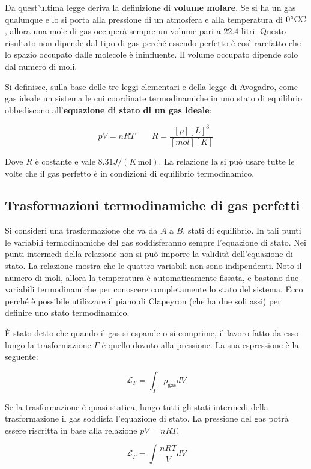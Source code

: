 Da quest'ultima legge deriva la definizione di \textbf{volume molare}. Se si ha un gas qualunque e lo si porta alla pressione di un atmosfera e alla temperatura di $0 ^\circ\text{C} \text{C}$, allora una mole di gas occuperà sempre un volume pari a $22.4$ litri. Questo risultato non dipende dal tipo di gas perché essendo perfetto è così rarefatto che lo spazio occupato dalle molecole è ininfluente. Il volume occupato dipende solo dal numero di moli.

Si definisce, sulla base delle tre leggi elementari e della legge di Avogadro, come gas ideale un sistema le cui coordinate termodinamiche in uno stato di equilibrio obbediscono all'\textbf{equazione di stato di un gas ideale}:

\[
	\boxed{pV=nRT} \qquad R=\frac{[p][L]^3}{[mol][K]}
\]

Dove $R$ è costante e vale $8.31 J/(K\,\text{mol})$.
La relazione la si può usare tutte le volte che il gas perfetto è in condizioni di equilibrio termodinamico.

\subsection{Trasformazioni termodinamiche di gas perfetti}

Si consideri una trasformazione che va da $A$ a $B$, stati di equilibrio. In tali punti le variabili termodinamiche del gas soddisferanno sempre l'equazione di stato. Nei punti intermedi della relazione non si può imporre la validità dell'equazione di stato.
La relazione mostra che le quattro variabili non sono indipendenti. Noto il numero di moli, allora la temperatura è automaticamente fissata, e bastano due variabili termodinamiche per conoscere completamente lo stato del sistema. Ecco perché è possibile utilizzare il piano di Clapeyron (che ha due soli assi) per definire uno stato termodinamico.

È stato detto che quando il gas si espande o si comprime, il lavoro fatto da esso lungo la trasformazione $\Gamma$ è quello dovuto alla pressione. La sua espressione è la seguente:

\[
	\mathcal{L}_{\Gamma} = \int_{\Gamma }\rho_{\text{gas} }dV
\]

Se la trasformazione è quasi statica, lungo tutti gli stati intermedi della trasformazione il gas soddisfa l'equazione di stato. La pressione del gas potrà essere riscritta in base alla relazione $pV=nRT$.

\[
	\mathcal{L}_{\Gamma }= \int \frac{nRT}{V}dV
\]

